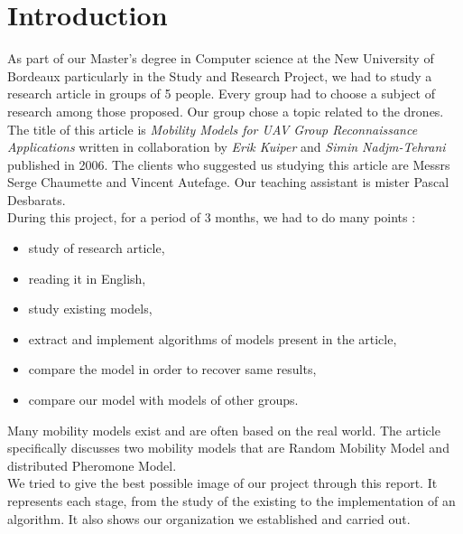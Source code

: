 \chapter*{Introduction}

As part of our Master's degree in Computer science at the New University of Bordeaux particularly in the Study and Research Project, we had to study a research article in groups of 5 people. Every group had to choose a subject of research among those proposed. Our group chose a topic related to the drones. The title of this article is \textit{Mobility Models for UAV Group Reconnaissance Applications} written in collaboration by \textit{Erik Kuiper} and \textit{Simin Nadjm-Tehrani} published in 2006. The clients who suggested us studying this article are Messrs Serge Chaumette and Vincent Autefage. Our teaching assistant is mister Pascal Desbarats.\\

\noindent During this project, for a period of 3 months, we had to do many points :
\begin{itemize}
\item study of research article,
\item reading it in English,
\item study existing models,
\item extract and implement algorithms of models present in the article,
\item compare the model in order to recover same results,
\item compare our model with models of other groups.
\end{itemize}

Many mobility models exist and are often based on the real world.
The article specifically discusses two mobility models that are Random Mobility Model and distributed Pheromone Model.\\

We tried to give the best possible image of our project through this report. It represents each stage, from the study of the existing to the implementation of an algorithm. It also shows our organization we established and carried out. 
